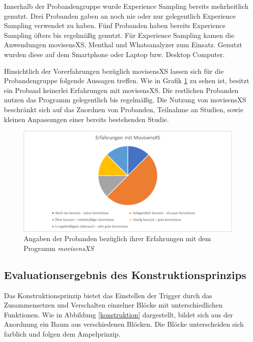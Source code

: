 Innerhalb der Probandengruppe wurde Experience Sampling bereits mehrheitlich genutzt. Drei Probanden gaben an noch nie oder nur gelegentlich Experience Sampling verwendet zu haben. Fünf Probanden haben bereits Experience Sampling öfters bis regelmäßig genutzt. Für Experience Sampling kamen die Anwendungen movisensXS, Menthal und Whatsanalyzer zum Einsatz. Genutzt wurden diese auf dem Smartphone oder Laptop bzw. Desktop Computer. 

Hinsichtlich der Vorerfahrungen bezüglich movisensXS lassen sich für die Probandengruppe folgende Aussagen treffen. Wie in Grafik \ref{movisensXSErfahrung} zu sehen ist, besitzt ein Proband keinerlei Erfahrungen mit movisensXS. Die restlichen Probanden nutzen das Programm gelegentlich bis regelmäßig. Die Nutzung von movisensXS beschränkt sich auf das Zuordnen von Probanden, Teilnahme an Studien, sowie kleinen Anpassungen einer bereits bestehenden Studie. 

\begin{figure}[h]
\centering
\includegraphics[width=1\textwidth]{pictures/diagramme/movi}
\caption{Angaben der Probanden bezüglich ihrer Erfahrungen mit dem Programm \emph{movisensXS}}
\label{movisensXSErfahrung}
\end{figure}


\subsection{Evaluationsergebnis des Konstruktionsprinzips}
Das Konstruktionsprinzip bietet das Einstellen der Trigger durch das Zusammensetzen und Verschalten einzelner Blöcke mit unterschiedlichen Funktionen. Wie in Abbildung \ref{konstruktion} dargestellt, bildet sich aus der Anordnung ein Baum aus verschiedenen Blöcken. Die Blöcke unterscheiden sich farblich und folgen dem Ampelprinzip.  

